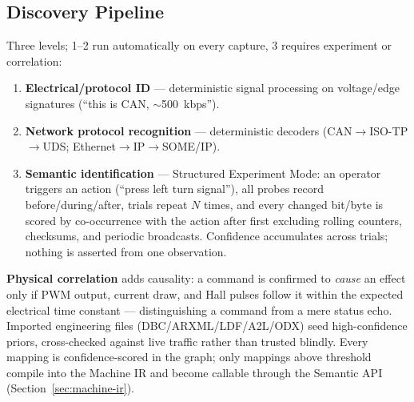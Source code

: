 \subsection{Discovery Pipeline}
\label{sec:probe-discovery}
Three levels; 1--2 run automatically on every capture, 3 requires experiment or correlation:
\begin{enumerate}[itemsep=0.1em]
\item \textbf{Electrical/protocol ID} --- deterministic signal processing on voltage/edge signatures (``this is CAN, $\sim$500~kbps'').
\item \textbf{Network protocol recognition} --- deterministic decoders (CAN$\to$ISO-TP$\to$UDS; Ethernet$\to$IP$\to$SOME/IP).
\item \textbf{Semantic identification} --- Structured Experiment Mode:\label{sec:correlation} an operator triggers an action (``press left turn signal''), all probes record before/during/after, trials repeat $N$ times, and every changed bit/byte is scored by co-occurrence with the action after first excluding rolling counters, checksums, and periodic broadcasts. Confidence accumulates across trials; nothing is asserted from one observation.
\end{enumerate}
\textbf{Physical correlation}\label{sec:physical-correlation} adds causality: a command is confirmed to \emph{cause} an effect only if PWM output, current draw, and Hall pulses follow it within the expected electrical time constant --- distinguishing a command from a mere status echo. Imported engineering files (DBC/ARXML/LDF/A2L/ODX) seed high-confidence priors, cross-checked against live traffic rather than trusted blindly. Every mapping is confidence-scored in the graph; only mappings above threshold compile into the Machine IR and become callable through the Semantic API (Section~\ref{sec:machine-ir}).
